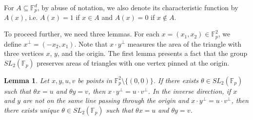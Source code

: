 \documentclass[11pt]{article}
\newtheorem{theorem}{Theorem}[section]
\newtheorem{lemma}[theorem]{Lemma}
\def\Fbb{\mathbb{F}}
\def\SL{SL}
\def\l({\left(}
\def\r){\right)}
\def\lv{\left\vert}
\def\rv{\right\vert}
\def\lo{\left\{}
\def\ro{\right\}}
\def\lV{\left\Vert}
\def\rV{\right\Vert}
\begin{document}
For $A\subseteq \Fbb_p^d $, by abuse of notation, we also denote its characteristic function by $A(x)$, i.e. $A(x)=1$ if $x\in A$ and $A(x)=0$ if $x\not\in A$.  


To proceed further, we need three lemmas. For each $x =\l( x_1,x_2 \r) \in \Fbb_p^2$, we define $x^\perp = \l( -x_2,x_1 \r)$. Note that $x\cdot y^\perp$ measures the area of the triangle with three vertices $x$, $y$, and the origin.  The first lemma presents a fact that the group $SL_2(\mathbb{F}_p)$ preserves areas of triangles with one vertex pinned at the origin.
\begin{lemma}\label{lmmay2}
Let $x, y, u, v$ be points in $\mathbb{F}_p^2\setminus\{(0, 0)\}$. If there exists $\theta \in \SL_2(\mathbb{F}_p)$ such that $\theta x=u$ and $\theta y=v$, then $x\cdot y^\perp=u\cdot v^\perp$. In the inverse direction, if $x$ and $y$ are not on the same line passing through the origin and $x\cdot y^\perp=u\cdot v^\perp$, then there exists unique $\theta\in SL_2(\mathbb{F}_p)$ such that $\theta x=u$ and $\theta y=v$. 
\end{lemma}
\end{document}
